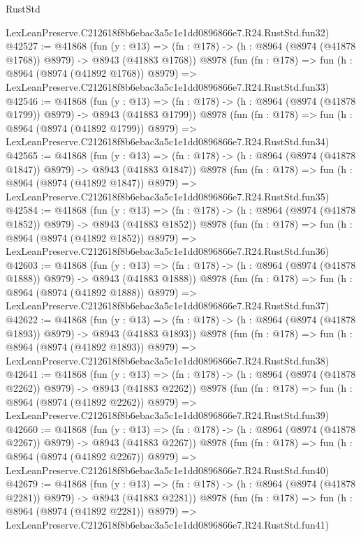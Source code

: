 \begin{lexlean}{RustStd}
\begin{coremodule}
    LexLeanPreserve.C212618f8b6ebac3a5c1e1dd0896866e7.R24.RustStd.fun32)
@42527 := @41868
    (fun (y : @13) =>
    (fn : @178) -> (h : @8964 (@8974 (@41878 @1768)) @8979) -> @8943 (@41883 @1768))
    @8978
    (fun (fn : @178) =>
    fun (h : @8964 (@8974 (@41892 @1768)) @8979) =>
    LexLeanPreserve.C212618f8b6ebac3a5c1e1dd0896866e7.R24.RustStd.fun33)
@42546 := @41868
    (fun (y : @13) =>
    (fn : @178) -> (h : @8964 (@8974 (@41878 @1799)) @8979) -> @8943 (@41883 @1799))
    @8978
    (fun (fn : @178) =>
    fun (h : @8964 (@8974 (@41892 @1799)) @8979) =>
    LexLeanPreserve.C212618f8b6ebac3a5c1e1dd0896866e7.R24.RustStd.fun34)
@42565 := @41868
    (fun (y : @13) =>
    (fn : @178) -> (h : @8964 (@8974 (@41878 @1847)) @8979) -> @8943 (@41883 @1847))
    @8978
    (fun (fn : @178) =>
    fun (h : @8964 (@8974 (@41892 @1847)) @8979) =>
    LexLeanPreserve.C212618f8b6ebac3a5c1e1dd0896866e7.R24.RustStd.fun35)
@42584 := @41868
    (fun (y : @13) =>
    (fn : @178) -> (h : @8964 (@8974 (@41878 @1852)) @8979) -> @8943 (@41883 @1852))
    @8978
    (fun (fn : @178) =>
    fun (h : @8964 (@8974 (@41892 @1852)) @8979) =>
    LexLeanPreserve.C212618f8b6ebac3a5c1e1dd0896866e7.R24.RustStd.fun36)
@42603 := @41868
    (fun (y : @13) =>
    (fn : @178) -> (h : @8964 (@8974 (@41878 @1888)) @8979) -> @8943 (@41883 @1888))
    @8978
    (fun (fn : @178) =>
    fun (h : @8964 (@8974 (@41892 @1888)) @8979) =>
    LexLeanPreserve.C212618f8b6ebac3a5c1e1dd0896866e7.R24.RustStd.fun37)
@42622 := @41868
    (fun (y : @13) =>
    (fn : @178) -> (h : @8964 (@8974 (@41878 @1893)) @8979) -> @8943 (@41883 @1893))
    @8978
    (fun (fn : @178) =>
    fun (h : @8964 (@8974 (@41892 @1893)) @8979) =>
    LexLeanPreserve.C212618f8b6ebac3a5c1e1dd0896866e7.R24.RustStd.fun38)
@42641 := @41868
    (fun (y : @13) =>
    (fn : @178) -> (h : @8964 (@8974 (@41878 @2262)) @8979) -> @8943 (@41883 @2262))
    @8978
    (fun (fn : @178) =>
    fun (h : @8964 (@8974 (@41892 @2262)) @8979) =>
    LexLeanPreserve.C212618f8b6ebac3a5c1e1dd0896866e7.R24.RustStd.fun39)
@42660 := @41868
    (fun (y : @13) =>
    (fn : @178) -> (h : @8964 (@8974 (@41878 @2267)) @8979) -> @8943 (@41883 @2267))
    @8978
    (fun (fn : @178) =>
    fun (h : @8964 (@8974 (@41892 @2267)) @8979) =>
    LexLeanPreserve.C212618f8b6ebac3a5c1e1dd0896866e7.R24.RustStd.fun40)
@42679 := @41868
    (fun (y : @13) =>
    (fn : @178) -> (h : @8964 (@8974 (@41878 @2281)) @8979) -> @8943 (@41883 @2281))
    @8978
    (fun (fn : @178) =>
    fun (h : @8964 (@8974 (@41892 @2281)) @8979) =>
    LexLeanPreserve.C212618f8b6ebac3a5c1e1dd0896866e7.R24.RustStd.fun41)

\end{coremodule}
\end{lexlean}
